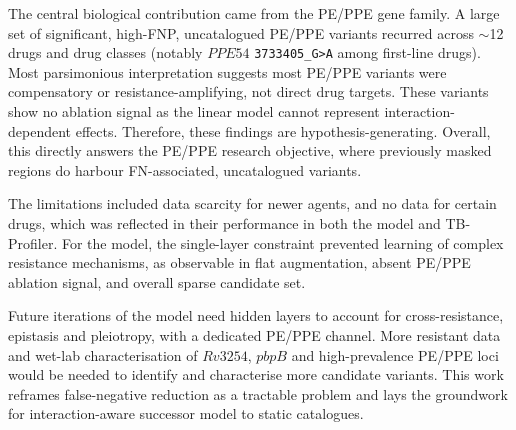 The central biological contribution came from the PE/PPE gene family. A large set of significant, high-FNP, uncatalogued PE/PPE variants recurred across $\sim$12 drugs and drug classes (notably $PPE54$ \texttt{3733405\_G>A} among first-line drugs). Most parsimonious interpretation suggests most PE/PPE variants were compensatory or resistance-amplifying, not direct drug targets. These variants show no ablation signal as the linear model cannot represent interaction-dependent effects. Therefore, these findings are hypothesis-generating. Overall, this directly answers the PE/PPE research objective, where previously masked regions do harbour FN-associated, uncatalogued variants.

The limitations included data scarcity for newer agents, and no data for certain drugs, which was reflected in their performance in both the model and TB-Profiler. For the model, the single-layer constraint prevented learning of complex resistance mechanisms, as observable in flat augmentation, absent PE/PPE ablation signal, and overall sparse candidate set. 

Future iterations of the model need hidden layers to account for cross-resistance, epistasis and pleiotropy, with a dedicated PE/PPE channel. More resistant data and wet-lab characterisation of $Rv3254$, $pbpB$ and high-prevalence PE/PPE loci would be needed to identify and characterise more candidate variants. This work reframes false-negative reduction as a tractable problem and lays the groundwork for interaction-aware successor model to static catalogues.
